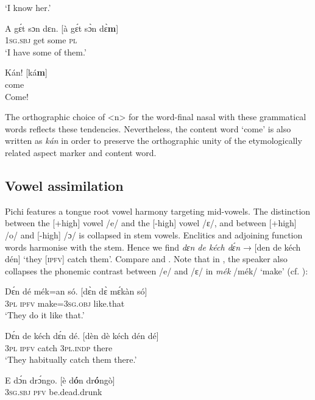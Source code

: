 \glt ‘I know her.’
\z


\ea%
    \label{ex:key:33}
    \gll   A    gɛ́t  sɔn    dɛn.        [à  gɛ́t  sɔ̀n  dɛ̀\textbf{m}]\\
\textsc{1sg.sbj}  get  some  \textsc{pl}\\

\glt ‘I have some of them.’
\z


\ea%
    \label{ex:key:34}
    \gll   Kán!                  [ká\textbf{m}]\\
come\\

\glt Come!
\z

The orthographic choice of <n> for the word-final nasal with these grammatical words reflects these tendencies. Nevertheless, the content word ‘come’ is also written as \textit{kán} in order to preserve the orthographic unity of the etymologically related aspect marker and content word. 

\subsection{Vowel assimilation}\label{sec:2.5.3}

Pichi features a tongue root vowel harmony targeting mid-vowels. The distinction between the [+high] vowel /e/ and the [-high] vowel /ɛ/, and between [+high] /o/ and \mbox{[-high]} /ɔ/ is collapsed in stem vowels. Enclitics and adjoining function words harmonise with the stem. Hence we find \textit{dɛn de kéch dɛ́n} → [den de kéch dén] ‘they [\textsc{ipfv}] catch them’. Compare  and . Note that in , the speaker also collapses the phonemic contrast between /e/ and /ɛ/ in \textit{mék} /mék/ ‘make’ (cf. ):


\ea%
    \label{ex:key:35}
    \gll   Dɛ́n  dé  mék=an    só.          [dɛ̀n  dɛ̀ mɛ́kàn só]\\
\textsc{3pl}  \textsc{ipfv}  make=\textsc{3sg.obj}  like.that\\

\glt ‘They do it like that.’
\z


\ea%
    \label{ex:key:36}
    \gll   Dɛ́n  de  kéch  dɛ́n    dé.        [dèn   dè kéch dén dé]\\
\textsc{3pl}  \textsc{ipfv}  catch  \textsc{3pl.indp}  there\\

\glt ‘They habitually catch them there.’
\z


\ea%
    \label{ex:key:37}
    \gll   E    dɔ́n    drɔ́ngo.          [è d\textbf{ó}n dr\textbf{ó}ngò]\\
\textsc{3sg.sbj}  \textsc{pfv}    be.dead.drunk\\

